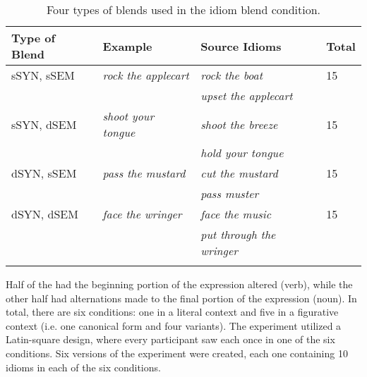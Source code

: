 \documentclass[output=paper
,modfonts
,nonflat]{langsci/langscibook}
\begin{document}
\begin{table}[h]
\begin{center}
\caption{\normalsize{Four types of blends used in the idiom blend condition. }}
\label{blendTypes}
\small{
\begin{tabular}{llll}
\lsptoprule
\bf{Type of Blend}&\textbf{Example}&\textbf{Source Idioms}&\textbf{Total}\\
\midrule
sSYN, sSEM&\textit{rock the applecart}&\textit{rock the boat}&15\\
&&\textit{upset the applecart}&\\
sSYN, dSEM&\textit{shoot your tongue}&\textit{shoot the breeze}&15\\
&&\textit{hold your tongue}&\\
dSYN, sSEM&\textit{pass the mustard}&\textit{cut the mustard}&15\\
&&\textit{pass muster}&\\
dSYN, dSEM&\textit{face the wringer}&\textit{face the music}&15\\
&&\textit{put through the wringer}&\\
\lspbottomrule
\end{tabular}
}
\end{center}
\end{table}


Half of the  had the beginning portion of the expression altered (verb), while the other half had alternations made to the final portion of the expression (noun). In total, there are six conditions: one in a literal context and five in a figurative context (i.e. one canonical form and four variants). The experiment utilized a Latin-square design, where every participant saw each  once in one of the six conditions. Six versions of the experiment were created, each one containing 10 idioms in each of the six conditions.\\
\end{document}
